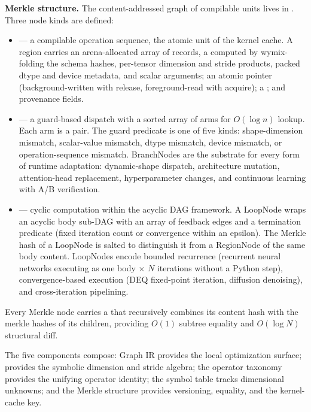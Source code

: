 \textbf{Merkle structure.}
The content-addressed graph of compilable units lives in .
Three node kinds are defined:

\begin{itemize}
  \item {} --- a compilable operation sequence, the atomic unit of the kernel cache.
        A region carries an arena-allocated array of  records, a  computed by wymix-folding the schema hashes, per-tensor dimension and stride products, packed dtype and device metadata, and scalar arguments;
        an atomic  pointer (background-written with release, foreground-read with acquire);
        a ; and provenance fields.
  \item {} --- a guard-based dispatch with a sorted array of arms for $O(\log n)$ lookup.
        Each arm is a  pair.
        The guard predicate is one of five kinds: shape-dimension mismatch, scalar-value mismatch, dtype mismatch, device mismatch, or operation-sequence mismatch.
        BranchNodes are the substrate for every form of runtime adaptation: dynamic-shape dispatch, architecture mutation, attention-head replacement, hyperparameter changes, and continuous learning with A/B verification.
  \item {} --- cyclic computation within the acyclic DAG framework.
        A LoopNode wraps an acyclic body sub-DAG with an array of feedback edges and a termination predicate (fixed iteration count or convergence within an epsilon).
        The Merkle hash of a LoopNode is salted to distinguish it from a RegionNode of the same body content.
        LoopNodes encode bounded recurrence (recurrent neural networks executing as one body $\times$ $N$ iterations without a Python step), convergence-based execution (DEQ fixed-point iteration, diffusion denoising), and cross-iteration pipelining.
\end{itemize}

Every Merkle node carries a  that recursively combines its content hash with the merkle hashes of its children, providing $O(1)$ subtree equality and $O(\log N)$ structural diff.

The five components compose: Graph IR provides the local optimization surface;  provides the symbolic dimension and stride algebra; the operator taxonomy provides the unifying operator identity; the symbol table tracks dimensional unknowns; and the Merkle structure provides versioning, equality, and the kernel-cache key.

